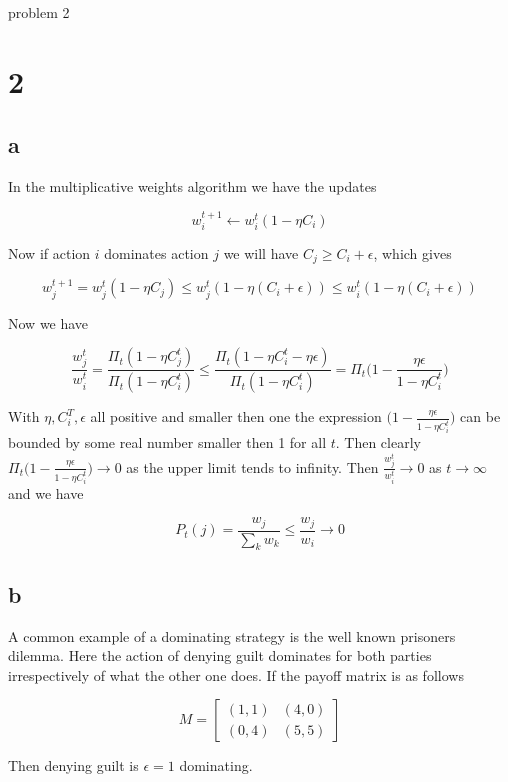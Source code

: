 problem 2

\section*{2}

\subsection*{a}

In the multiplicative weights algorithm we have the updates

$$
w_i^{t+1} \leftarrow w_i^t (1- \eta C_i)
$$

Now if action $i$ dominates action $j$ we will have $C_j \ge C_i + \epsilon$, which gives

$$
w_j^{t+1} =  w_j^t (1- \eta C_j) \le w_j^t (1- \eta (C_i + \epsilon)) \le w_i^t (1- \eta (C_i + \epsilon))
$$

Now we have

$$
\frac{w_j^t}{w_i^t} = \frac{ \Pi_t (1- \eta C_j^t)}{\Pi_t (1- \eta C_i^t)} \le \frac{ \Pi_t (1- \eta C_i^t - \eta \epsilon)}{\Pi_t (1- \eta C_i^t)} = \Pi_t \bigg(1- \frac{\eta \epsilon}{1- \eta C_i^t} \bigg)
$$

With $\eta, C_i^T, \epsilon$ all positive and smaller then one the expression $\big(1- \frac{\eta \epsilon}{1- \eta C_i^t} \big)$ can be bounded by some real number smaller then 1 for all $t$. Then clearly $\Pi_t \big(1- \frac{\eta \epsilon}{1- \eta C_i^t} \big) \rightarrow 0$ as the upper limit tends to infinity. Then $\frac{w_j^t}{w_i^t} \rightarrow 0$ as $t \rightarrow \infty$ and we have

$$
P_t(j) = \frac{w_j}{\sum_k w_k} \le \frac{w_j}{w_i} \rightarrow 0
$$

\subsection*{b}

A common example of a dominating strategy is the well known prisoners dilemma. Here the action of denying guilt dominates for both parties irrespectively of what the other one does. If the payoff matrix is as follows

$$
   M=
  \left[ {\begin{array}{cc}
   (1,1) & (4,0) \\ (0,4) & (5,5) \end{array} } \right]
$$

Then denying guilt is $\epsilon=1$ dominating.


